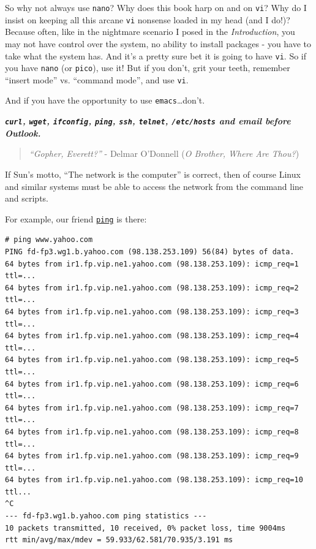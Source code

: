 \documentclass[10pt,]{book}
\numberwithin{figure}{chapter}
\begin{document}
So why not always use \texttt{nano}? Why does this book harp on and on
\texttt{vi}? Why do I insist on keeping all this arcane \texttt{vi}
nonsense loaded in my head (and I do!)? Because often, like in the
nightmare scenario I posed in the \emph{Introduction}, you may not have
control over the system, no ability to install packages - you have to
take what the system has. And it's a pretty sure bet it is going to have
\texttt{vi}. So if you have \texttt{nano} (or \texttt{pico}), use it!
But if you don't, grit your teeth, remember ``insert mode'' vs.
``command mode'', and use \texttt{vi}.

And if you have the opportunity to use \texttt{emacs}\ldots{}don't.


\textbf{\emph{\texttt{curl}, \texttt{wget}, \texttt{ifconfig},
\texttt{ping}, \texttt{ssh}, \texttt{telnet}, \texttt{/etc/hosts} and
email before Outlook.}}

\begin{quote}
\emph{``Gopher, Everett?''} - Delmar O'Donnell (\emph{O Brother, Where
Are Thou?})
\end{quote}

If Sun's motto, ``The network is the computer'' is correct, then of
course Linux and similar systems must be able to access the network from
the command line and scripts.

For example, our friend
\href{http://linux.die.net/man/8/ping}{\texttt{ping}} is there:

\begin{verbatim}
# ping www.yahoo.com
PING fd-fp3.wg1.b.yahoo.com (98.138.253.109) 56(84) bytes of data.
64 bytes from ir1.fp.vip.ne1.yahoo.com (98.138.253.109): icmp_req=1 ttl=...
64 bytes from ir1.fp.vip.ne1.yahoo.com (98.138.253.109): icmp_req=2 ttl=...
64 bytes from ir1.fp.vip.ne1.yahoo.com (98.138.253.109): icmp_req=3 ttl=...
64 bytes from ir1.fp.vip.ne1.yahoo.com (98.138.253.109): icmp_req=4 ttl=...
64 bytes from ir1.fp.vip.ne1.yahoo.com (98.138.253.109): icmp_req=5 ttl=...
64 bytes from ir1.fp.vip.ne1.yahoo.com (98.138.253.109): icmp_req=6 ttl=...
64 bytes from ir1.fp.vip.ne1.yahoo.com (98.138.253.109): icmp_req=7 ttl=...
64 bytes from ir1.fp.vip.ne1.yahoo.com (98.138.253.109): icmp_req=8 ttl=...
64 bytes from ir1.fp.vip.ne1.yahoo.com (98.138.253.109): icmp_req=9 ttl=...
64 bytes from ir1.fp.vip.ne1.yahoo.com (98.138.253.109): icmp_req=10 ttl...
^C
--- fd-fp3.wg1.b.yahoo.com ping statistics ---
10 packets transmitted, 10 received, 0% packet loss, time 9004ms
rtt min/avg/max/mdev = 59.933/62.581/70.935/3.191 ms
\end{verbatim}
\end{document}

